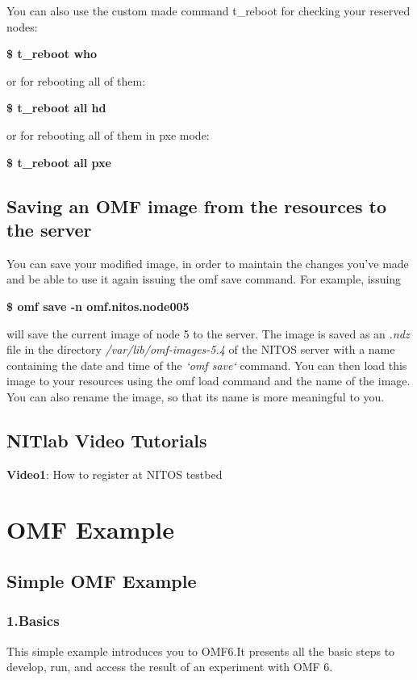 \documentclass[letterpaper,10pt,english]{sphinxmanual}
\begin{document}
You can also use the custom made command t\_reboot for checking your reserved nodes:

\textbf{\$ t\_reboot who}

or for rebooting all of them:

\textbf{\$ t\_reboot all hd}

or for rebooting all of them in pxe mode:

\textbf{\$ t\_reboot all pxe}


\section{Saving an OMF image from the resources to the server}
\label{save_OMFimage::doc}\label{save_OMFimage:saving-an-omf-image-from-the-resources-to-the-server}
You can save your modified image, in order to maintain the changes you've made and be able to use it again issuing the omf save command. For example, issuing

\textbf{\$ omf save -n omf.nitos.node005}

will save the current image of node 5 to the server. The image is saved as an \emph{.ndz} file in the directory \emph{/var/lib/omf-images-5.4} of the NITOS server with a name containing the date and time of the \emph{{}`omf save{}`} command. You can then load this image to your resources using the omf load command and the name of the image. You can also rename the image, so that its name is more meaningful to you.


\section{NITlab Video Tutorials}
\label{video_tutorials:nitlab-video-tutorials}\label{video_tutorials::doc}
\textbf{Video1}: How to register at NITOS testbed


\chapter{OMF Example}
\label{index:omf-example}

\section{Simple OMF Example}
\label{omf_example:simple-omf-example}\label{omf_example::doc}

\subsection{1.Basics}
\label{omf_example:basics}
This simple example introduces you to OMF6.It presents all the basic steps to develop, run, and access the result of an experiment with OMF 6.
\end{document}
